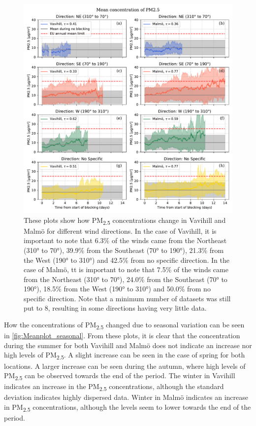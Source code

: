 \begin{figure}[H]
    \centering
    \includegraphics[width=\textwidth]{Figures/Meanplot_dir.pdf}
    \caption{These plots show how PM\textsubscript{2.5} concentrations change in Vavihill and Malmö for different wind directions. In the case of Vavihill, it is important to note that 6.3\% of the winds came from the Northeast (310° to 70°), 39.9\% from the Southeast (70° to 190°), 21.3\% from the West (190° to 310°) and 42.5\% from no specific direction. In the case of Malmö, tt is important to note that 7.5\% of the winds came from the Northeast (310° to 70°), 24.0\% from the Southeast (70° to 190°), 18.5\% from the West (190° to 310°) and 50.0\% from no specific direction. Note that a minimum number of datasets was still put to 8, resulting in some directions having very little data.}
    \label{fig:Meanplot_wind}
\end{figure}


How the concentrations of PM\textsubscript{2.5} changed due to seasonal variation can be seen in \autoref{fig:Meanplot_seasonal}. From these plots, it is clear that the concentration during the summer for both Vavihill and Malmö does not indicate an increase nor high levels of PM\textsubscript{2.5}. A slight increase can be seen in the case of spring for both locations. A larger increase can be seen during the autumn, where high levels of PM\textsubscript{2.5} can be observed towards the end of the period. The winter in Vavihill indicates an increase in the PM\textsubscript{2.5} concentrations, although the standard deviation indicates highly dispersed data. Winter in Malmö indicates an increase in PM\textsubscript{2.5} concentrations, although the levels seem to lower towards the end of the period.

